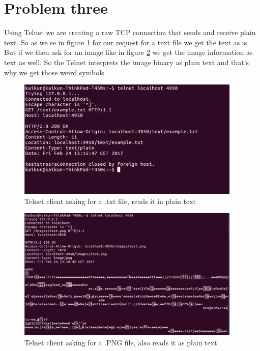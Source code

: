 \documentclass[a4paper,12pt]{article}
\numberwithin{figure}{section}
\begin{document}
\newpage

\section{Problem three}

Using Telnet we are creating a raw TCP connection that sends and receive plain text. So as we se in figure \ref{TEXT} for our request for a text file we get the text as is. But if we then ask for an image like in figure \ref{IMAGE} we get the image information as text as well. So the Telnet interprets the image binary as plain text and that's why we get those weird symbols.

\begin{figure}[h!]
	\centering
	\includegraphics[width=0.95\textwidth,keepaspectratio]{img/TEXT.jpg} 
	\caption{Telnet client asking for a .txt file, reads it in plain text}
	\label{TEXT}
\end{figure}

\begin{figure}[h!]
	\centering
	\includegraphics[width=0.95\textwidth,keepaspectratio]{img/IMAGE.jpg} 
	\caption{Telnet client asking for a .PNG file, also reads it as plain text}
	\label{IMAGE}
\end{figure}
\end{document}
